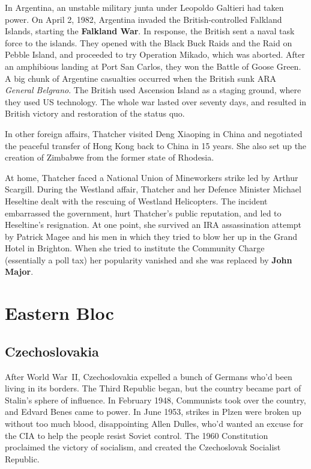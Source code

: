 In Argentina, an unstable military junta under Leopoldo Galtieri had taken power.
On April 2, 1982, Argentina invaded the British-controlled Falkland Islands, starting the \textbf{Falkland War}.
In response, the British sent a naval task force to the islands.
They opened with the Black Buck Raids and the Raid on Pebble Island,
and proceeded to try Operation Mikado, which was aborted.
After an amphibious landing at Port San Carlos, they won the Battle of Goose Green.
A big chunk of Argentine casualties occurred when the British sunk ARA \textit{General Belgrano}.
The British used Ascension Island as a staging ground, where they used US technology.
The whole war lasted over seventy days, and resulted in British victory and restoration of the status quo.

In other foreign affairs, Thatcher visited Deng Xiaoping in China
and negotiated the peaceful transfer of Hong Kong back to China in 15 years.
She also set up the creation of Zimbabwe from the former state of Rhodesia.

At home, Thatcher faced a National Union of Mineworkers strike led by Arthur Scargill.
During the Westland affair,
Thatcher and her Defence Minister Michael Heseltine dealt with the rescuing of Westland Helicopters.
The incident embarrassed the government, hurt Thatcher's public reputation, and led to Heseltine's resignation.
At one point, she survived an IRA assassination attempt by Patrick Magee and his men
in which they tried to blow her up in the Grand Hotel in Brighton.
When she tried to institute the Community Charge (essentially a poll tax)
her popularity vanished and she was replaced by \textbf{John Major}.

\section{Eastern Bloc}

\subsection*{Czechoslovakia}

After World War~II, Czechoslovakia expelled a bunch of Germans who'd been living in its borders.
The Third Republic began, but the country became part of Stalin's sphere of influence.
In February 1948, Communists took over the country, and Edvard Benes came to power.
In June 1953, strikes in Plzen were broken up without too much blood,
disappointing Allen Dulles, who'd wanted an excuse for the CIA to help the people resist Soviet control.
The 1960 Constitution proclaimed the victory of socialism, and created the Czechoslovak Socialist Republic.

